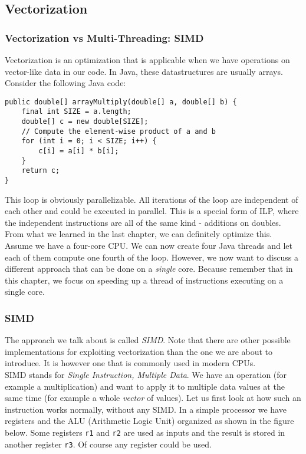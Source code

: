 \documentclass[main.tex]{subfiles}
\begin{document}
\subsection{Vectorization}
\label{vectorization}
\subsubsection{Vectorization vs Multi-Threading: SIMD}
Vectorization is an optimization that is applicable when we have operations on vector-like data in our code. In Java, these datastructures are usually arrays. Consider the following Java code:
\begin{verbatim}
public double[] arrayMultiply(double[] a, double[] b) {
    final int SIZE = a.length;
    double[] c = new double[SIZE];
    // Compute the element-wise product of a and b
    for (int i = 0; i < SIZE; i++) {
        c[i] = a[i] * b[i];
    }
    return c;
}
\end{verbatim}
This loop is obviously parallelizable. All iterations of the loop are independent of each other and could be executed in parallel. This is a special form of ILP, where the independent instructions are all of the same kind - additions on doubles. From what we learned in the last chapter, we can definitely optimize this. Assume we have a four-core CPU. We can now create four Java threads and let each of them compute one fourth of the loop. However, we now want to discuss a different approach that can be done on a \textit{single} core. Because remember that in this chapter, we focus on speeding up a thread of instructions executing on a single core.

\subsubsection{SIMD}
The approach we talk about is called \textit{SIMD}. Note that there are other possible implementations for exploiting vectorization than the one we are about to introduce. It is however one that is commonly used in modern CPUs.\\
SIMD stands for \textit{Single Instruction, Multiple Data}. We have an operation (for example a multiplication) and want to apply it to multiple data values at the same time (for example a whole \textit{vector} of values). Let us first look at how such an instruction works normally, without any SIMD. In a simple processor we have registers and the ALU (Arithmetic Logic Unit) organized as shown in the figure below. Some registers \texttt{r1} and \texttt{r2} are used as inputs and the result is stored in another register \texttt{r3}. Of course any register could be used.
\end{document}
